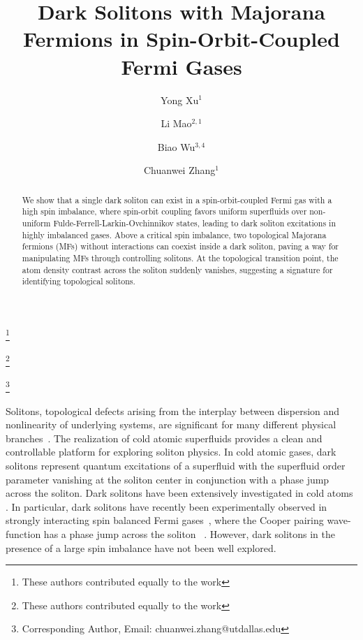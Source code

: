 \documentclass[prl,aps,twocolumn,showpacs, floatfix]{revtex4}
\begin{document}
\title{Dark Solitons with Majorana Fermions in Spin-Orbit-Coupled Fermi Gases%
}
\author{Yong Xu$^{1}$}
\thanks{These authors contributed equally to the work}
\author{Li Mao$^{2,1}$}
\thanks{These authors contributed equally to the work}
\author{Biao Wu$^{3,4}$}
\author{Chuanwei Zhang$^{1}$}
\thanks{Corresponding Author, Email: chuanwei.zhang@utdallas.edu}

\begin{abstract}
We show that a single dark soliton can exist in a spin-orbit-coupled Fermi
gas with a high spin imbalance, where spin-orbit coupling favors uniform
superfluids over non-uniform Fulde-Ferrell-Larkin-Ovchinnikov states,
leading to dark soliton excitations in highly imbalanced gases. Above a
critical spin imbalance, two topological Majorana fermions (MFs) without
interactions can coexist inside a dark soliton, paving a way for
manipulating MFs through controlling solitons. At the topological transition
point, the atom density contrast across the soliton suddenly vanishes,
suggesting a signature for identifying topological solitons.
\end{abstract}

\maketitle

Solitons, topological defects arising from the interplay between dispersion
and nonlinearity of underlying systems, are significant for many different
physical branches~\cite{DrazinBook,DickeyBook,KivsharBook,KevrekidisBook}.
The realization of cold atomic superfluids provides a clean and controllable
platform for exploring soliton physics. In cold atomic gases, dark solitons
represent quantum excitations of a superfluid with the superfluid order
parameter vanishing at the soliton center in conjunction with a phase jump
across the soliton. Dark solitons have been extensively investigated in cold
atoms \cite{Carr2000JPB,Jackson1998PRA,
Dum1998PRL,Muryshev1999PRA,Fedichev1999PRA,DSOCEPL2013,Burger1999PRL,Denschlag2000Science,Anderson2001PRL}%
. In particular, dark solitons have recently been experimentally observed in
strongly interacting spin balanced Fermi gases~\cite{Martin2013Nature},
where the Cooper pairing wave-function has a phase jump across the soliton~%
\cite{Dziarmaga2005Laser,Stringari2007PRA,Stringari2012PRL,Liao2011PRA,
Spuntarelli2011NJP,Scott2012NJP,Cetoli2013PRA}. However, dark solitons in
the presence of a large spin imbalance have not been well explored.
\end{document}
